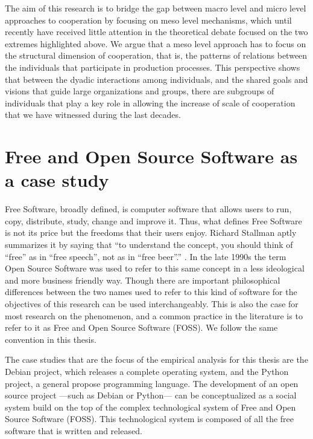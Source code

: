 The aim of this research is to bridge the gap between macro level and micro level approaches to cooperation by focusing on meso level mechanisms, which until recently have received little attention in the theoretical debate focused on the two extremes highlighted above. We argue that a meso level approach has to focus on the structural dimension of cooperation, that is, the patterns of relations between the individuals that participate in production processes. This perspective shows that between the dyadic interactions among individuals, and the shared goals and visions that guide large organizations and groups, there are subgroups of individuals that play a key role in allowing the increase of scale of cooperation that we have witnessed during the last decades.

\section{Free and Open Source Software as a case study}

Free Software, broadly defined, is computer software that allows users to run, copy, distribute, study, change and improve it. Thus, what defines Free Software is not its price but the freedoms that their users enjoy. Richard Stallman aptly summarizes it by saying that ``to understand the concept, you should think of ``free'' as in ``free speech'', not as in ``free beer''.'' \citep[3]{stallman:2002}. In the late 1990s the term Open Source Software was used to refer to this same concept in a less ideological and more business friendly way. Though there are important philosophical differences between the two names used to refer to this kind of software \citep[75]{stallman:2002b} for the objectives of this research can be used interchangeably. This is also the case for most research on the phenomenon, and a common practice in the literature is to refer to it as Free and Open Source Software (FOSS). We follow the same convention in this thesis.

The case studies that are the focus of the empirical analysis for this thesis are the Debian project, which releases a complete operating system, and the Python project, a general propose programming language. The development of an open source project ---such as Debian or Python--- can be conceptualized as a social system build on the top of the complex technological system of Free and Open Source Software (FOSS). This technological system is composed of all the free software that is written and released.

